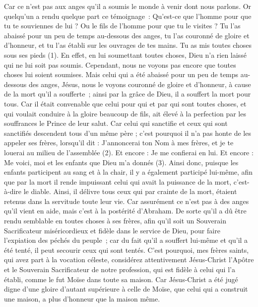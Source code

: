 \begin{multicols}{2}
Car ce n'est pas aux anges qu'il a soumis le monde à venir dont nous parlons.
Or quelqu'un a rendu quelque part ce témoignage : Qu'est-ce que l'homme pour que tu te souviennes de lui ? Ou le fils de l'homme pour que tu le visites ?
Tu l'as abaissé pour un peu de temps au-dessous des anges, tu l'as couronné de gloire et d'honneur, et tu l'as établi sur les ouvrages de tes mains.
Tu as mis toutes choses sous ses pieds (1). En effet, en lui soumettant toutes choses, Dieu n'a rien laissé qui ne lui soit pas soumis. Cependant, nous ne voyons pas encore que toutes choses lui soient soumises.
Mais celui qui a été abaissé pour un peu de temps au-dessous des anges, Jésus, nous le voyons couronné de gloire et d'honneur, à cause de la mort qu’il a soufferte ; ainsi par la grâce de Dieu, il a souffert la mort pour tous.
Car il était convenable que celui pour qui et par qui sont toutes choses, et qui voulait conduire à la gloire beaucoup de fils, ait élevé à la perfection par les souffrances le Prince de leur salut.
Car celui qui sanctifie et ceux qui sont sanctifiés descendent tous d'un même père ; c'est pourquoi il n’a pas honte de les appeler ses frères,
lorsqu’il dit : J'annoncerai ton Nom à mes frères, et je te louerai au milieu de l'assemblée (2).
Et encore : Je me confierai en lui. Et encore : Me voici, moi et les enfants que Dieu m'a donnés (3).
Ainsi donc, puisque les enfants participent au sang et à la chair, il y a également participé lui-même, afin que par la mort il rende impuissant celui qui avait la puissance de la mort, c'est-à-dire le diable.
Ainsi, il délivre tous ceux qui par crainte de la mort, étaient retenus dans la servitude toute leur vie.
Car assurément ce n’est pas à des anges qu’il vient en aide, mais c’est à la postérité d'Abraham.
De sorte qu’il a dû être rendu semblable en toutes choses à ses frères, afin qu'il soit un Souverain Sacrificateur miséricordieux et fidèle dans le service de Dieu, pour faire l’expiation des péchés du peuple ;
car du fait qu'il a souffert lui-même et qu’il a été tenté, il peut secourir ceux qui sont tentés.
\VerseOne{}C'est pourquoi, mes frères saints, qui avez part à la vocation céleste, considérez attentivement Jésus-Christ l'Apôtre et le Souverain Sacrificateur de notre profession,
qui est fidèle à celui qui l'a établi, comme le fut Moïse dans toute sa maison.
Car Jésus-Christ a été jugé digne d'une gloire d'autant supérieure à celle de Moïse, que celui qui a construit une maison, a plus d’honneur que la maison même.

\end{multicols}

